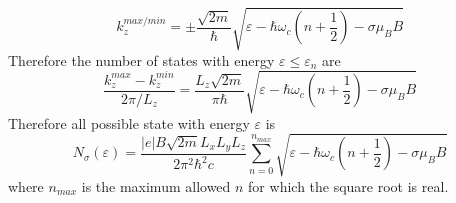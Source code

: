 \documentclass[aps,prb,onecolumn,notitlepage,showpacs,floatfix,superscriptaddress]{revtex4-1}
\begin{document}
\begin{equation}
k_z^{max/min} = \pm \dfrac{\sqrt{2m}}{\hbar} \sqrt{\varepsilon - \hbar \omega_c \left(n+\dfrac{1}{2}\right)-\sigma \mu_B B}
\end{equation}
Therefore the number of states with energy $\varepsilon \leq \varepsilon_n$ are
\begin{equation}
\dfrac{k_z^{max}-k_z^{min}}{2\pi/L_z} =  \dfrac{L_z \sqrt{2m}}{\pi\hbar} \sqrt{\varepsilon - \hbar \omega_c \left(n+\dfrac{1}{2}\right)-\sigma \mu_B B}
\end{equation}
Therefore all possible state with energy $\varepsilon$ is
\begin{equation}
N_\sigma (\varepsilon) = \dfrac{|e| B \sqrt{2m} L_x L_y L_z }{2 \pi^2 \hbar^2 c} \sum_{n=0}^{n_{max}} \sqrt{\varepsilon - \hbar \omega_c \left(n+\dfrac{1}{2}\right)-\sigma \mu_B B}
\end{equation}
where $n_{max}$ is the maximum allowed $n$ for which the square root is real.
\end{document}
